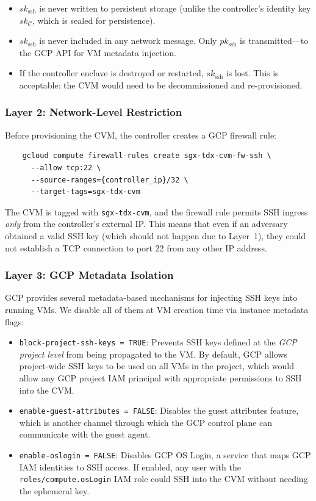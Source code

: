 \begin{itemize}
    \item $sk_{\text{ssh}}$ is never written to persistent storage (unlike the controller's identity key $sk_\mathcal{C}$, which is sealed for persistence).
    \item $sk_{\text{ssh}}$ is never included in any network message. Only $pk_{\text{ssh}}$ is transmitted---to the GCP API for VM metadata injection.
    \item If the controller enclave is destroyed or restarted, $sk_{\text{ssh}}$ is lost. This is acceptable: the CVM would need to be decommissioned and re-provisioned.
\end{itemize}

\subsubsection{Layer 2: Network-Level Restriction}

Before provisioning the CVM, the controller creates a GCP firewall rule:

\begin{verbatim}
    gcloud compute firewall-rules create sgx-tdx-cvm-fw-ssh \
      --allow tcp:22 \
      --source-ranges={controller_ip}/32 \
      --target-tags=sgx-tdx-cvm
\end{verbatim}

The CVM is tagged with \texttt{sgx-tdx-cvm}, and the firewall rule permits SSH ingress \emph{only} from the controller's external IP. This means that even if an adversary obtained a valid SSH key (which should not happen due to Layer~1), they could not establish a TCP connection to port 22 from any other IP address.

\subsubsection{Layer 3: GCP Metadata Isolation}

GCP provides several metadata-based mechanisms for injecting SSH keys into running VMs. We disable all of them at VM creation time via instance metadata flags:

\begin{itemize}
    \item \texttt{block-project-ssh-keys = TRUE}: Prevents SSH keys defined at the \emph{GCP project level} from being propagated to the VM. By default, GCP allows project-wide SSH keys to be used on all VMs in the project, which would allow any GCP project IAM principal with appropriate permissions to SSH into the CVM.
    \item \texttt{enable-guest-attributes = FALSE}: Disables the guest attributes feature, which is another channel through which the GCP control plane can communicate with the guest agent.
    \item \texttt{enable-oslogin = FALSE}: Disables GCP OS Login, a service that maps GCP IAM identities to SSH access. If enabled, any user with the \texttt{roles/compute.osLogin} IAM role could SSH into the CVM without needing the ephemeral key.
\end{itemize}

